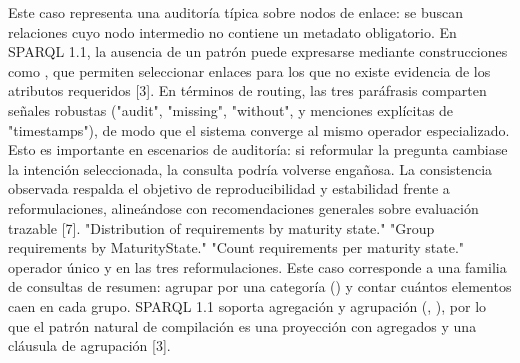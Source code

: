 \markdownRendererUlEndTight \markdownRendererInterblockSeparator
{} Este caso representa una auditoría típica sobre nodos de enlace: se buscan relaciones cuyo nodo intermedio no contiene un metadato obligatorio. En SPARQL 1.1, la ausencia de un patrón puede expresarse mediante construcciones como , que permiten seleccionar enlaces para los que no existe evidencia de los atributos requeridos [3].\markdownRendererInterblockSeparator
{}En términos de routing, las tres paráfrasis comparten señales robustas ("audit", "missing", "without", y menciones explícitas de "timestamps"), de modo que el sistema converge al mismo operador especializado. Esto es importante en escenarios de auditoría: si reformular la pregunta cambiase la intención seleccionada, la consulta podría volverse engañosa. La consistencia observada respalda el objetivo de reproducibilidad y estabilidad frente a reformulaciones, alineándose con recomendaciones generales sobre evaluación trazable [7].\markdownRendererInterblockSeparator
{}\markdownRendererInterblockSeparator
{}\markdownRendererUlBeginTight
\markdownRendererUlItem {} \markdownRendererUlItemEnd 
\markdownRendererUlItem {}\markdownRendererInterblockSeparator
{}\markdownRendererUlBeginTight
\markdownRendererUlItem "Distribution of requirements by maturity state."\markdownRendererUlItemEnd 
\markdownRendererUlItem "Group requirements by Maturity\markdownRendererUnderscore{}State."\markdownRendererUlItemEnd 
\markdownRendererUlItem "Count requirements per maturity state."\markdownRendererUlItemEnd 
\markdownRendererUlEndTight \markdownRendererUlItemEnd 
\markdownRendererUlItem {} operador único  y  en las tres reformulaciones.\markdownRendererUlItemEnd 
\markdownRendererUlEndTight \markdownRendererInterblockSeparator
{} Este caso corresponde a una familia de consultas de resumen: agrupar por una categoría () y contar cuántos elementos caen en cada grupo. SPARQL 1.1 soporta agregación y agrupación (, ), por lo que el patrón natural de compilación es una proyección con agregados y una cláusula de agrupación [3].\markdownRendererInterblockSeparator
